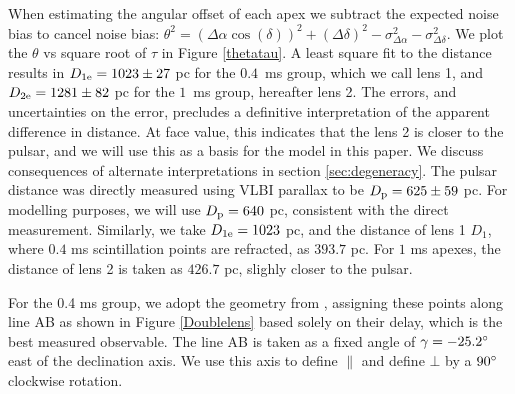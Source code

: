 \documentclass[useAMS,usenatbib]{mn2e}
\begin{document}
When estimating the
angular offset of each apex
we subtract the expected noise bias to cancel noise bias:
${\theta}^2=({\Delta\alpha}\cos(\delta))^2+({\Delta\delta})^2-\sigma^2_{\Delta\alpha}-\sigma^2_{\Delta\delta}$. 
We plot the $\theta$ vs square root of $\tau$ in Figure
\ref{thetatau}. A least square fit to the distance results in
$D_{1{\rm e}}=1023\pm 27$ pc for the  $0.4$\ ms group, which we call lens 1, and
$D_{2{\rm e}} = 1281 \pm 82$ pc for the $1$\ ms group, hereafter lens 2.
The errors, and uncertainties on the error, precludes a definitive
interpretation of the apparent difference in distance.  At face value, 
this indicates that the lens 2 is closer to the pulsar, and we will
use this as a basis for the model in this paper.  We discuss
consequences of alternate interpretations in section \ref{sec:degeneracy}.
The pulsar distance was directly measured using VLBI parallax to be
$D_{\rm p} = 625 \pm 59$ pc.  For modelling purposes, we will use
$D_{\rm p} = 640$ pc, consistent with the direct measurement.  Similarly,
we take $D_{1{\rm e}}=1023$ pc,  and the distance of lens 1 $D_{1}$,
where $0.4$ ms scintillation points are refracted, as $393.7$
pc. For $1$ ms apexes, the distance of lens 2 is taken as $426.7$ pc,
slighly closer to the pulsar.


For the 0.4 ms group, we adopt the geometry from
\citet{2010ApJ...708..232B}, assigning these points along line AB as
shown in Figure \ref{Doublelens} based solely on their delay, which is
the best measured observable. The line AB is taken as a
fixed angle of $\gamma=-25.2\degree$ east of the
declination axis. We use this axis
to define ${\parallel}$ and define ${\bot}$ by a $90\degree$ clockwise
rotation.  
\end{document}
